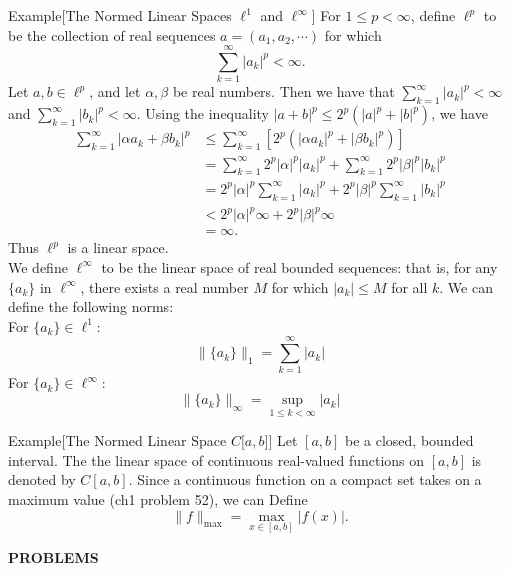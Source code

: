 \begin{flushleft}
	\begin{namedthm*}{Example}[The Normed Linear Spaces $\ell^1$ and $\ell^\infty$]
		For $1\le p<\infty$, define $\ell^p$ to be the collection of real sequences $a=(a_1,a_2,\cdots)$ for which 
		\[
		\sum_{k=1}^\infty|a_k|^p<\infty .	
		\]
		Let $a,b \in \ell^p$, and let $\alpha , \beta$ be real numbers.
		Then we have that $\sum_{k=1}^\infty|a_k|^p<\infty$ and $\sum_{k=1}^\infty|b_k|^p<\infty$.
		Using the inequality $|a+b|^p\le2^p(|a|^p+|b|^p)$, we have
		\begin{align*}
			\sum_{k=1}^\infty|\alpha a_k + \beta b_k|^p &\le \sum_{k=1}^\infty[2^p(|\alpha a_k|^p + |\beta b_k|^p)]\\ 
			&=\sum_{k=1}^\infty2^p|\alpha|^p |a_k|^p+\sum_{k=1}^\infty2^p|\beta|^p| b_k|^p\\
			&=2^p|\alpha|^p\sum_{k=1}^\infty |a_k|^p+2^p|\beta|^p\sum_{k=1}^\infty| b_k|^p\\
			&< 2^p|\alpha|^p\infty+2^p|\beta|^p\infty\\
			&=\infty.
		\end{align*}
		Thus $\ell^p$ is a linear space.\\
		We define $\ell^\infty$ to be the linear space of real bounded sequences: that is, for any $\{a_k\}$ in $\ell^\infty$, there exists a real number $M$ for which $|a_k|\le M$ for all $k$.
		We can define the following norms:
		\\For $\{a_k\}\in\ell^1$:
		\[
			\|\{a_k\}\|_1 = \sum_{k=1}^\infty|a_k|
		\]
		For $\{a_k\}\in\ell^\infty$:
		\[
			\|\{a_k\}\|_\infty = \sup_{1\le k<\infty}|a_k|
		\]
	\end{namedthm*}

	\begin{namedthm*}{Example}[The Normed Linear Space $C\lbrack a,b\rbrack$]
		Let $[a,b]$ be a closed, bounded interval. 
		The the linear space of continuous real-valued functions on $[a,b]$ is denoted by $C[a,b]$. 
		Since a continuous function on a compact set takes on a maximum value (ch1 problem 52), we can Define
		\[
		\|f\|_{\max}=\max_{x\in [a,b]}|f(x)|.	
		\]		
	\end{namedthm*}

\end{flushleft}
\begin{center}
	\textbf{PROBLEMS}
\end{center}
